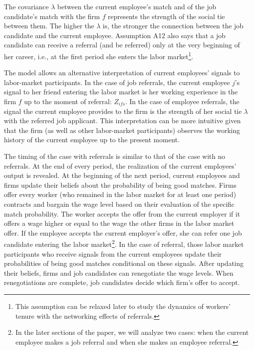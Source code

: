 \documentclass[12pt]{article}
\begin{document}
The covariance $\lambda$ between the current employee's match and of the job candidate's match with the firm $f$ represents the strength of the social tie between them. The higher the $\lambda$ is, the stronger the connection between the job candidate and the current employee. Assumption A12 also says that a job candidate can receive a referral (and be referred) only at the very beginning of her career, i.e., at the first period she enters the labor market\footnote{This assumption can be relaxed later to study the dynamics of workers' tenure with the networking effects of referrals.}. 

The model allows an alternative interpretation of current employees' signals to labor-market participants. In the case of job referrals, the current employee $j$'s signal to her friend entering the labor market is her working experience in the firm $f$ up to the moment of referral: $Z_{ifs}$. In the case of employee referrals, the signal the current employee provides to the firm is the strength of her social tie $\lambda$ with the referred job applicant. This interpretation can be more intuitive given that the firm (as well as  other labor-market participants) observes the working history of the current employee up to the present moment.

The timing of the case with referrals is similar to that of the case with no referrals. At the end of every period, the realization of the current employees' output is revealed. At the beginning of the next period, current employees and firms update their beliefs about the probability of being good matches. Firms offer every worker (who remained in the labor market for at least one period) contracts and bargain the wage level based on their evaluation of the specific match probability. The worker accepts the offer from the current employer if it offers a wage higher or equal to the wage the other firms in the labor market offer. If the employee accepts the current employer's offer, she can refer one job candidate entering the labor market\footnote{In the later sections of the paper, we will analyze two cases: when the current employee makes a job referral and when she makes an employee referral.}. In the case of referral, those labor market participants who receive signals from the current employees update their probabilities of being good matches conditional on these signals. After updating their beliefs, firms and job candidates can renegotiate the wage levels. When renegotiations are complete, job candidates decide which firm's offer to accept.
\end{document}
